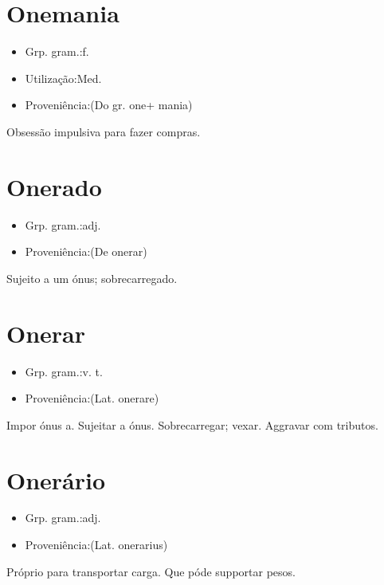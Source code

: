 \section{Onemania}
\begin{itemize}
\item {Grp. gram.:f.}
\end{itemize}
\begin{itemize}
\item {Utilização:Med.}
\end{itemize}
\begin{itemize}
\item {Proveniência:(Do gr. \textunderscore one\textunderscore  + \textunderscore mania\textunderscore )}
\end{itemize}
Obsessão impulsiva para fazer compras.
\section{Onerado}
\begin{itemize}
\item {Grp. gram.:adj.}
\end{itemize}
\begin{itemize}
\item {Proveniência:(De \textunderscore onerar\textunderscore )}
\end{itemize}
Sujeito a um ónus; sobrecarregado.
\section{Onerar}
\begin{itemize}
\item {Grp. gram.:v. t.}
\end{itemize}
\begin{itemize}
\item {Proveniência:(Lat. \textunderscore onerare\textunderscore )}
\end{itemize}
Impor ónus a.
Sujeitar a ónus.
Sobrecarregar; vexar.
Aggravar com tributos.
\section{Onerário}
\begin{itemize}
\item {Grp. gram.:adj.}
\end{itemize}
\begin{itemize}
\item {Proveniência:(Lat. \textunderscore onerarius\textunderscore )}
\end{itemize}
Próprio para transportar carga.
Que póde supportar pesos.
